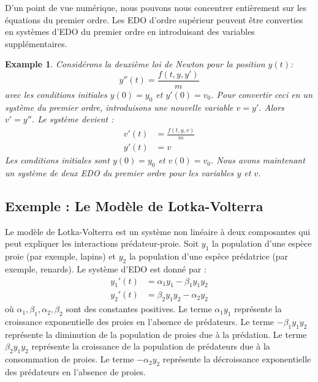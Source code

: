 \documentclass{article}
\newtheorem{example}{Example}
\begin{document}
D'un point de vue numérique, nous pouvons nous concentrer entièrement sur les équations du premier ordre. Les EDO d'ordre supérieur peuvent être converties en systèmes d'EDO du premier ordre en introduisant des variables supplémentaires.

\begin{example}
Considérons la deuxième loi de Newton pour la position $y(t)$:
\[ y''(t) = \frac{f(t, y, y')}{m} \]
avec les conditions initiales $y(0) = y_0$ et $y'(0) = v_0$.
Pour convertir ceci en un système du premier ordre, introduisons une nouvelle variable $v = y'$. Alors $v' = y''$. Le système devient :
\begin{align*} v'(t) &= \frac{f(t, y, v)}{m} \\ y'(t) &= v \end{align*}
Les conditions initiales sont $y(0) = y_0$ et $v(0) = v_0$. Nous avons maintenant un système de deux EDO du premier ordre pour les variables $y$ et $v$.
\end{example}

\subsection*{Exemple : Le Modèle de Lotka-Volterra}

Le modèle de Lotka-Volterra est un système non linéaire à deux composantes qui peut expliquer les interactions prédateur-proie. Soit $y_1$ la population d'une espèce proie (par exemple, lapins) et $y_2$ la population d'une espèce prédatrice (par exemple, renards). Le système d'EDO est donné par :
\begin{align*} y_1'(t) &= \alpha_1 y_1 - \beta_1 y_1 y_2 \\ y_2'(t) &= \beta_2 y_1 y_2 - \alpha_2 y_2 \end{align*}
où $\alpha_1, \beta_1, \alpha_2, \beta_2$ sont des constantes positives. Le terme $\alpha_1 y_1$ représente la croissance exponentielle des proies en l'absence de prédateurs. Le terme $-\beta_1 y_1 y_2$ représente la diminution de la population de proies due à la prédation. Le terme $\beta_2 y_1 y_2$ représente la croissance de la population de prédateurs due à la consommation de proies. Le terme $-\alpha_2 y_2$ représente la décroissance exponentielle des prédateurs en l'absence de proies.
\end{document}
